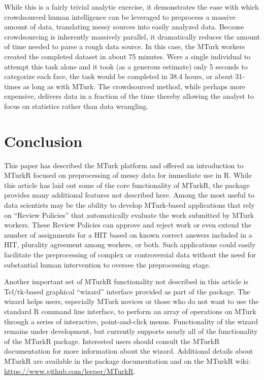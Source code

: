 While this is a fairly trivial analytic exercise, it demonstrates the ease with which crowdsourced human intelligence can be leveraged to preprocess a massive amount of data, translating messy sources into easily analyzed data. Because crowdsourcing is inherently massively parallel, it dramatically reduces the amount of time needed to parse a rough data source. In this case, the MTurk workers created the completed dataset in about 75 minutes. Were a single individual to attempt this task alone and it took (as a generous estimate) only 5 seconds to categorize each face, the task would be completed in 38.4 hours, or about 31-times as long as with MTurk. The crowdsourced method, while perhaps more expensive, delivers data in a fraction of the time thereby allowing the analyst to focus on statistics rather than data wrangling.

\section{Conclusion}

This paper has described the MTurk platform and offered an introduction to MTurkR focused on preprocessing of messy data for immediate use in R. While this article has laid out some of the core functionality of MTurkR, the package provides many additional features not described here. Among the most useful to data scientists may be the ability to develop MTurk-based applications that rely on ``Review Policies'' that automatically evaluate the work submitted by MTurk workers. These Review Policies can approve and reject work or even extend the number of assignments for a HIT based on known correct answers included in a HIT, plurality agreement among workers, or both. Such applications could easily facilitate the preprocessing of complex or controversial data without the need for substantial human intervention to oversee the preprocessing stage.

Another important set of MTurkR functionality not described in this article is Tcl/tk-based graphical ``wizard'' interface provided as part of the package. The wizard helps users, especially MTurk novices or those who do not want to use the standard R command line interface, to perform an array of operations on MTurk through a series of interactive, point-and-click menus. Functionality of the wizard remains under development, but currently supports nearly all of the functionality of the MTurkR package. Interested users should consult the MTurkR documentation for more information about the wizard. Additional details about MTurkR are available in the package documentation and on the MTurkR wiki: \url{https://www.github.com/leeper/MTurkR}.

